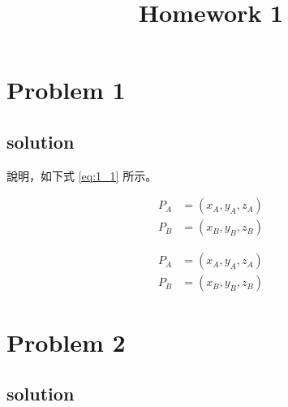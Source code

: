 \documentclass[12pt]{kjleehw}
\begin{document}
\begin{CJK}{UTF8}{bkai} %

\title{\textbf{Homework 1}}


\section{Problem 1}
\subsection*{solution} %

說明，如下式 \ref{eq:1_1} 所示。

\begin{equation}
\begin{aligned}
P_A &= (x_A,y_A,z_A) \\
P_B &= (x_B,y_B,z_B)
\end{aligned}
\label{eq:1_1}
\end{equation}

\begin{align*}
P_A &= (x_A,y_A,z_A) \\
P_B &= (x_B,y_B,z_B)
\end{align*}

\newpage

\section{Problem 2}
\subsection*{solution}




\end{CJK}
\end{document}
